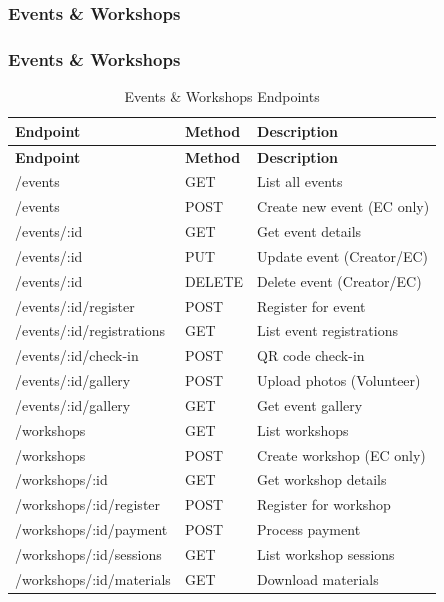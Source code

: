 \documentclass[12pt,a4paper]{article}
\begin{document}
\subsubsection{Events \& Workshops}

\subsubsection{Events \& Workshops}

\begin{longtable}{>{\small\ttfamily}p{6.5cm}%
                  >{\small\centering\arraybackslash}p{1.3cm}%
                  >{\small}p{6.7cm}}
\caption{Events \& Workshops Endpoints} \\

\rowcolor{Teal}
\color{white}\normalfont\bfseries Endpoint & \color{white}\bfseries Method & \color{white}\bfseries Description \\
\endfirsthead
\rowcolor{Teal}
\color{white}\normalfont\bfseries Endpoint & \color{white}\bfseries Method & \color{white}\bfseries Description \\
\endhead
\rowcolor{LightTeal}/events & GET & List all events \\
/events & POST & Create new event (EC only) \\
\rowcolor{LightTeal}/events/:id & GET & Get event details \\
/events/:id & PUT & Update event (Creator/EC) \\
\rowcolor{LightTeal}/events/:id & DELETE & Delete event (Creator/EC) \\
/events/:id/register & POST & Register for event \\
\rowcolor{LightTeal}/events/:id/registrations & GET & List event registrations \\
/events/:id/check-in & POST & QR code check-in \\
\rowcolor{LightTeal}/events/:id/gallery & POST & Upload photos (Volunteer) \\
/events/:id/gallery & GET & Get event gallery \\
\rowcolor{LightTeal}/workshops & GET & List workshops \\
/workshops & POST & Create workshop (EC only) \\
\rowcolor{LightTeal}/workshops/:id & GET & Get workshop details \\
/workshops/:id/register & POST & Register for workshop \\
\rowcolor{LightTeal}/workshops/:id/payment & POST & Process payment \\
/workshops/:id/sessions & GET & List workshop sessions \\
\rowcolor{LightTeal}/workshops/:id/materials & GET & Download materials \\
\bottomrule
\end{longtable}
\end{document}
